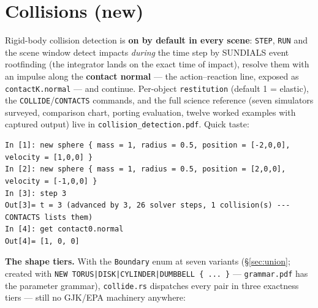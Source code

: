 \documentclass[11pt]{article}
\newcommand{\code}[1]{\texttt{#1}}
\begin{document}
\section{Collisions (new)}\label{sec:collisions}

Rigid-body collision detection is \textbf{on by default in every
scene}: \code{STEP}, \code{RUN} and the scene window detect impacts
\emph{during} the time step by SUNDIALS event rootfinding (the
integrator lands on the exact time of impact), resolve them with an
impulse along the \textbf{contact normal} --- the action--reaction
line, exposed as \code{contactK.normal} --- and continue. Per-object
\code{restitution} (default 1 = elastic), the
\code{COLLIDE}/\code{CONTACTS} commands, and the full science
reference (seven simulators surveyed, comparison chart, porting
evaluation, twelve worked examples with captured output) live in
\code{collision\_detection.pdf}. Quick taste:

\begin{lstlisting}
In [1]: new sphere { mass = 1, radius = 0.5, position = [-2,0,0], velocity = [1,0,0] }
In [2]: new sphere { mass = 1, radius = 0.5, position = [2,0,0], velocity = [-1,0,0] }
In [3]: step 3
Out[3]= t = 3 (advanced by 3, 26 solver steps, 1 collision(s) --- CONTACTS lists them)
In [4]: get contact0.normal
Out[4]= [1, 0, 0]
\end{lstlisting}

\textbf{The shape tiers.} With the \code{Boundary} enum at seven
variants (\S\ref{sec:union}; created with
\code{NEW TORUS|DISK|CYLINDER|DUMBBELL \{ ... \}} --- \code{grammar.pdf}
has the parameter grammar), \code{collide.rs} dispatches every pair in
three exactness tiers --- still no GJK/EPA machinery anywhere:
\end{document}
